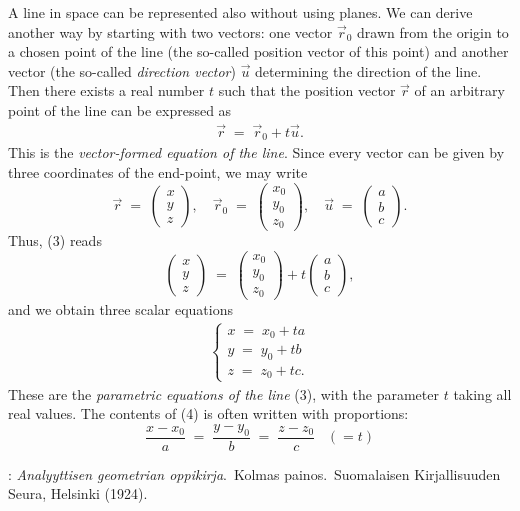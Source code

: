 \documentclass[12pt]{article}
\theoremstyle{definition}
\begin{document}
A line in space can be represented also without using planes.  We can derive another way by starting with two vectors:  one vector $\vec{r}_0$ drawn from the origin to a chosen point of the line  (the so-called position vector of this point) and another vector (the so-called {\em direction vector}) $\vec{u}$ determining the direction of the line.  Then there exists a real number $t$ such that the position vector $\vec{r}$ of an arbitrary point of the line can be expressed as
\begin{align}
    \vec{r} \;=\; \vec{r}_0\!+\!t\vec{u}.
\end{align}
This is the {\em vector-formed equation of the line}.  Since every vector can be given by three coordinates of the end-point, we may write
$$\vec{r} \;=\;
\begin{pmatrix}
x\\y\\z
\end{pmatrix},\quad \vec{r}_0 \;=\;
\begin{pmatrix}
x_0\\y_0\\z_0
\end{pmatrix},\quad \vec{u} \;=\;
\begin{pmatrix}
a\\b\\c
\end{pmatrix}\!.$$
Thus, (3) reads
$$\begin{pmatrix}
x\\y\\z
\end{pmatrix} \;=\;
\begin{pmatrix}
x_0\\y_0\\z_0
\end{pmatrix}+t
\begin{pmatrix}
a\\b\\c
\end{pmatrix}\!,$$
and we obtain three scalar equations
\begin{align}
\begin{cases}
         x \;=\; x_0\!+\!ta\\  
         y \;=\; y_0\!+\!tb\\
         z \;=\; z_0\!+\!tc.
\end{cases}
\end{align}
These are the {\em parametric equations of the line} (3), with the parameter $t$ taking all real values.  The contents of (4) is often written with proportions:
$$\frac{x\!-\!x_0}{a} \;=\; \frac{y\!-\!y_0}{b} \;=\; \frac{z\!-\!z_0}{c}\;\;\; (= t)$$

\begin{thebibliography}{8}
: {\em Analyyttisen geometrian oppikirja}.\, Kolmas painos.\, Suomalaisen Kirjallisuuden Seura, Helsinki (1924).
\end{thebibliography}





\end{document}
